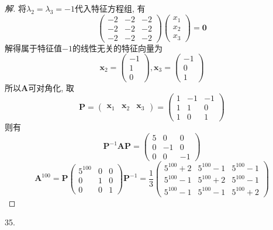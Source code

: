 \documentclass[10pt,a4paper]{report}
\def\*#1{\mathbf{#1}}
\begin{document}
\begin{proof}[解]
	将$\lambda_2 = \lambda_3 = -1$代入特征方程组, 有
	\[\begin{pmatrix}
	-2 & -2 & -2  \\
	-2 & -2 & -2 \\
	-2 & -2 & -2
	\end{pmatrix}
	\begin{pmatrix}
	x_1 \\
	x_2 \\
	x_3
	\end{pmatrix} = \*0\]
	解得属于特征值$-1$的线性无关的特征向量为
	\[\*x_2 = \begin{pmatrix}
	-1 \\
	1 \\
	0
	\end{pmatrix}, 
	\*x_3 = \begin{pmatrix}
	-1 \\
	0 \\
	1
	\end{pmatrix} \]
	所以$\*A$可对角化, 取
	\[\*P = \begin{pmatrix}
	\*x_1 & \*x_2 & \*x_3
	\end{pmatrix} = \begin{pmatrix}
	1 & -1 & -1 \\
	1 & 1 & 0 \\
	1 & 0 & 1
	\end{pmatrix}\]
	则有
	\[\*P^{-1}\*A\*P = \begin{pmatrix}
	5 & 0 & 0 \\
	0 & -1 & 0 \\
	0 & 0 & -1
	\end{pmatrix}\]
	\[ \*A^{100} = \*P\begin{pmatrix}
	5^{100} & 0 & 0 \\
	0 & 1 & 0 \\
	0 & 0 & 1
	\end{pmatrix} \*P^{-1} = \frac{1}{3} \begin{pmatrix}
	5^{100}+2 & 5^{100}-1 & 5^{100}-1 \\
	5^{100}-1 & 5^{100}+2 & 5^{100}-1 \\
	5^{100}-1 & 5^{100}-1 & 5^{100}+2
	\end{pmatrix} \]
\end{proof}
35.
\end{document}
